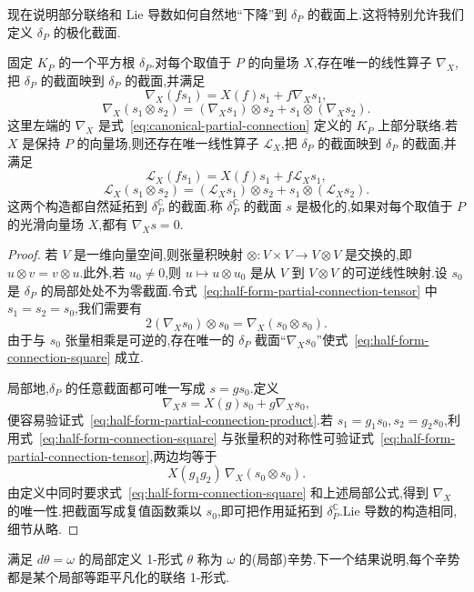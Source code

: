 {现在说明部分联络和 Lie 导数如何自然地“下降”到 $\delta_P$ 的截面上.这将特别允许我们定义 $\delta_P$ 的极化截面.

\begin{proposition}
\label{prop:half-form-connections}
固定 $K_P$ 的一个平方根 $\delta_P$.对每个取值于 $P$ 的向量场 $X$,存在唯一的线性算子 $\nabla_X$,把 $\delta_P$ 的截面映到 $\delta_P$ 的截面,并满足
\[
 \nabla_X(fs_1)=X(f)s_1+f\nabla_Xs_1,
 \label{eq:half-form-partial-connection-product}
\]
\[
 \nabla_X(s_1\otimes s_2)=(\nabla_Xs_1)\otimes s_2+s_1\otimes(\nabla_Xs_2).
 \label{eq:half-form-partial-connection-tensor}
\]
这里左端的 $\nabla_X$ 是式~\eqref{eq:canonical-partial-connection} 定义的 $K_P$ 上部分联络.若 $X$ 是保持 $P$ 的向量场,则还存在唯一线性算子 $\mathcal L_X$,把 $\delta_P$ 的截面映到 $\delta_P$ 的截面,并满足
\[
 \mathcal L_X(fs_1)=X(f)s_1+f\mathcal L_Xs_1,
\]
\[
 \mathcal L_X(s_1\otimes s_2)=(\mathcal L_Xs_1)\otimes s_2+s_1\otimes(\mathcal L_Xs_2).
\]
这两个构造都自然延拓到 $\delta_P^{\mathbb C}$ 的截面.称 $\delta_P^{\mathbb C}$ 的截面 $s$ 是极化的,如果对每个取值于 $P$ 的光滑向量场 $X$,都有 $\nabla_Xs=0$.
\end{proposition}

\begin{proof}
若 $V$ 是一维向量空间,则张量积映射 $\otimes:V\times V\to V\otimes V$ 是交换的,即 $u\otimes v=v\otimes u$.此外,若 $u_0\ne0$,则 $u\mapsto u\otimes u_0$ 是从 $V$ 到 $V\otimes V$ 的可逆线性映射.设 $s_0$ 是 $\delta_P$ 的局部处处不为零截面.令式~\eqref{eq:half-form-partial-connection-tensor} 中 $s_1=s_2=s_0$,我们需要有
\[
 2(\nabla_Xs_0)\otimes s_0=\nabla_X(s_0\otimes s_0).
 \label{eq:half-form-connection-square}
\]
由于与 $s_0$ 张量相乘是可逆的,存在唯一的 $\delta_P$ 截面“$\nabla_Xs_0$”使式~\eqref{eq:half-form-connection-square} 成立.

局部地,$\delta_P$ 的任意截面都可唯一写成 $s=gs_0$.定义
\[
 \nabla_Xs=X(g)s_0+g\nabla_Xs_0,
\]
便容易验证式~\eqref{eq:half-form-partial-connection-product}.若 $s_1=g_1s_0,s_2=g_2s_0$,利用式~\eqref{eq:half-form-connection-square} 与张量积的对称性可验证式~\eqref{eq:half-form-partial-connection-tensor},两边均等于
\[
 X(g_1g_2)\,\nabla_X(s_0\otimes s_0).
\]
由定义中同时要求式~\eqref{eq:half-form-connection-square} 和上述局部公式,得到 $\nabla_X$ 的唯一性.把截面写成复值函数乘以 $s_0$,即可把作用延拓到 $\delta_P^{\mathbb C}$.Lie 导数的构造相同,细节从略.
\end{proof}

满足 $d\theta=\omega$ 的局部定义 1-形式 $\theta$ 称为 $\omega$ 的(局部)辛势.下一个结果说明,每个辛势都是某个局部等距平凡化的联络 1-形式.

}%

